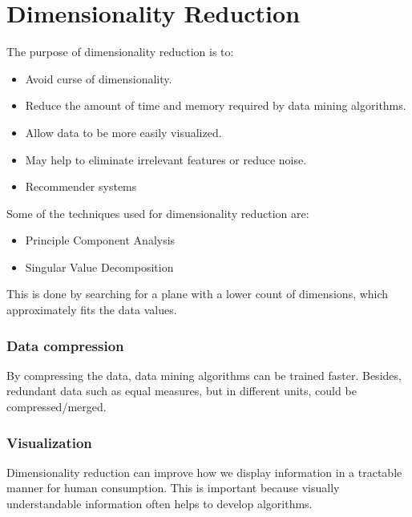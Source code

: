 \section{Dimensionality Reduction}
The purpose of dimensionality reduction is to:
\begin{itemize}
    \item Avoid curse of dimensionality.
    \item Reduce the amount of time and memory required by data mining algorithms.
    \item Allow data to be more easily visualized.
    \item May help to eliminate irrelevant features or reduce noise.
    \item Recommender systems
\end{itemize}
Some of the techniques used for dimensionality reduction are:
\begin{itemize}
    \item Principle Component Analysis
    \item Singular Value Decomposition
\end{itemize}

This is done by searching for a plane with a lower count of dimensions, which approximately fits the data values.

\subsubsection{Data compression}
By compressing the data, data mining algorithms can be trained faster. Besides, redundant data such as equal measures, but in different units, could be compressed/merged.

\subsubsection{Visualization}
Dimensionality reduction can improve how we display information in a tractable manner for human consumption.
This is important because visually understandable information often helps to develop algorithms.


